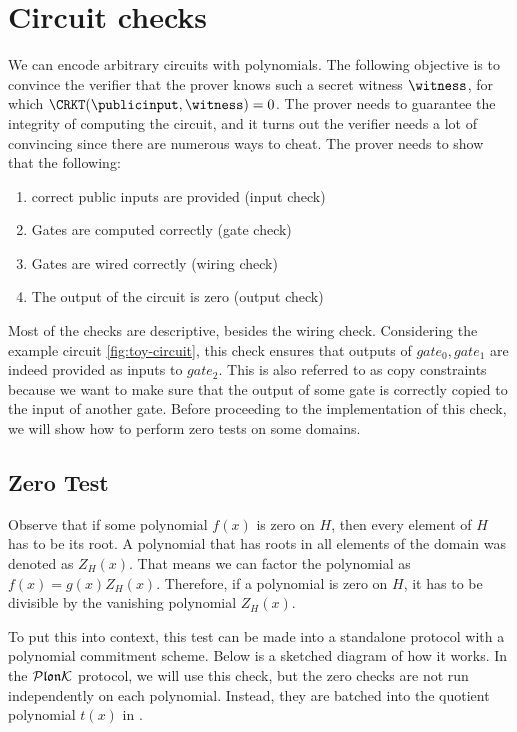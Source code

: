 \section{Circuit checks}
\label{sec:checks}
We can encode arbitrary circuits with polynomials. The following objective is to convince the verifier that the prover knows such a secret witness $\witness$, for which $\CRKT(\publicinput, \witness) = 0$. The prover needs to guarantee the integrity of computing the circuit, and it turns out the verifier needs a lot of convincing since there are numerous ways to cheat. The prover needs to show that the following:
\begin{enumerate}
    \label{plonk-checks}
    \item correct public inputs are provided (input check)
    \item Gates are computed correctly (gate check)
    \item Gates are wired correctly (wiring check)
    \item The output of the circuit is zero (output check)
\end{enumerate}

Most of the checks are descriptive, besides the wiring check. Considering the example circuit \eqref{fig:toy-circuit}, this check ensures that outputs of $gate_0, gate_1$ are indeed provided as inputs to $gate_2$. This is also referred to as copy constraints because we want to make sure that the output of some gate is correctly copied to the input of another gate. Before proceeding to the implementation of this check, we will show how to perform zero tests on some domains.

\subsection{Zero Test}
\label{zero-test-on-h}

Observe that if some polynomial $f(x)$ is zero on $H$, then every element of $H$ has to be its root. A polynomial that has roots in all elements of the domain was denoted as $Z_H(x)$. That means we can factor the polynomial as $f(x) = g(x)Z_H(x)$. Therefore, if a polynomial is zero on $H$, it has to be divisible by the vanishing polynomial $Z_H(x)$. 

To put this into context, this test can be made into a standalone protocol with a polynomial commitment scheme. Below is a sketched diagram of how it works. In the $\mathcal{P}\mathfrak{lon}\mathcal{K}$ protocol, we will use this check, but the zero checks are not run independently on each polynomial. Instead, they are batched into the quotient polynomial $t(x)$ in .

